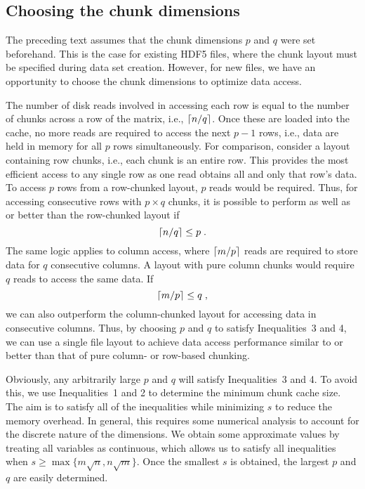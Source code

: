 \documentclass{article}
\begin{document}

\subsection{Choosing the chunk dimensions}
The preceding text assumes that the chunk dimensions $p$ and $q$ were set beforehand.
This is the case for existing HDF5 files, where the chunk layout must be specified during data set creation.
However, for new files, we have an opportunity to choose the chunk dimensions to optimize data access.

The number of disk reads involved in accessing each row is equal to the number of chunks across a row of the matrix, i.e., $\left \lceil n/q \right \rceil$.
Once these are loaded into the cache, no more reads are required to access the next $p-1$ rows, i.e., data are held in memory for all $p$ rows simultaneously.
For comparison, consider a layout containing row chunks, i.e., each chunk is an entire row.
This provides the most efficient access to any single row as one read obtains all and only that row's data.
To access $p$ rows from a row-chunked layout, $p$ reads would be required.
Thus, for accessing consecutive rows with $p \times q$ chunks, it is possible to perform as well as or better than the row-chunked layout if 
\begin{equation}
\left \lceil n/q \right \rceil \le p \;.
\end{equation}
The same logic applies to column access, where $\left \lceil m/p \right \rceil$ reads are required to store data for $q$ consecutive columns.
A layout with pure column chunks would require $q$ reads to access the same data.
If 
\begin{equation}
\left \lceil m/p \right \rceil \le q \;,
\end{equation}
we can also outperform the column-chunked layout for accessing data in consecutive columns.
Thus, by choosing $p$ and $q$ to satisfy Inequalities~3 and 4, we can use a single file layout to achieve data access performance similar to or better than that of pure column- or row-based chunking.

Obviously, any arbitrarily large $p$ and $q$ will satisfy Inequalities~3 and 4.
To avoid this, we use Inequalities~1 and 2 to determine the minimum chunk cache size.
The aim is to satisfy all of the inequalities while minimizing $s$ to reduce the memory overhead.
In general, this requires some numerical analysis to account for the discrete nature of the dimensions.
We obtain some approximate values by treating all variables as continuous, which allows us to satisfy all inequalities when $s \ge \max\{m\sqrt{n}, n\sqrt{m}\}$.
Once the smallest $s$ is obtained, the largest $p$ and $q$ are easily determined.
\end{document}
